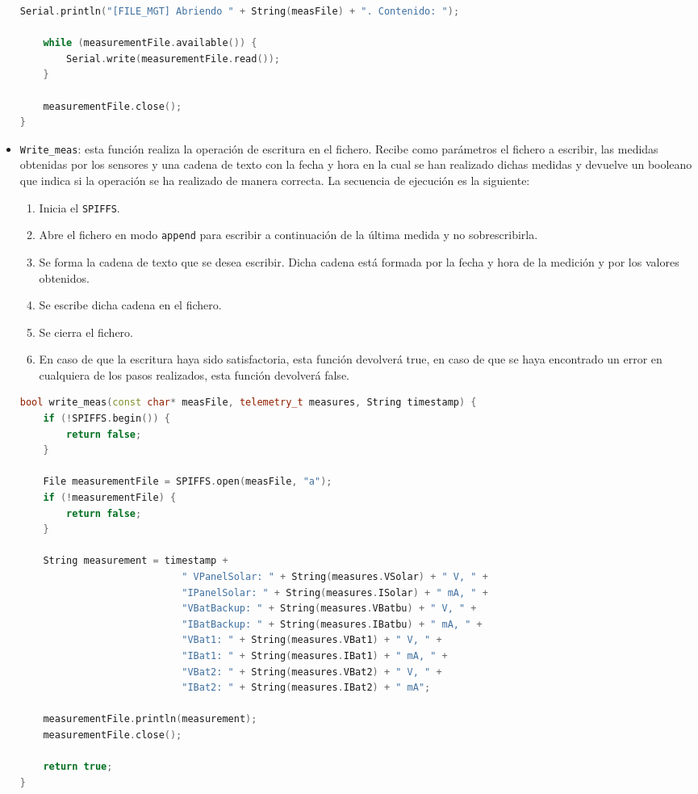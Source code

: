 \begin{itemize}
\begin{lstlisting}[captionpos=b, caption={Funcion \texttt{Read\_file}}, language=c++]
    Serial.println("[FILE_MGT] Abriendo " + String(measFile) + ". Contenido: ");

    while (measurementFile.available()) {
        Serial.write(measurementFile.read());
    }

    measurementFile.close();
}
    \end{lstlisting}
    \item \texttt{Write\_meas}: esta función realiza la operación de escritura en el fichero. Recibe como parámetros el fichero a escribir, las medidas obtenidas por los sensores y una cadena de texto con la fecha y hora en la cual se han realizado dichas medidas y devuelve un  booleano que indica si la operación se ha realizado de manera correcta. La secuencia de ejecución es la siguiente:
    \begin{enumerate}
        \item Inicia el \texttt{SPIFFS}.
        \item Abre el fichero en modo \texttt{append} para escribir a continuación de la última medida y no sobrescribirla.
        \item Se forma la cadena de texto que se desea escribir. Dicha cadena está formada por la fecha y hora de la medición y por los valores obtenidos.
        \item Se escribe dicha cadena en el fichero.
        \item Se cierra el fichero.
        \item En caso de que la escritura haya sido satisfactoria, esta función devolverá true, en caso de que se haya encontrado un error en cualquiera de los pasos realizados, esta función devolverá false.
    \end{enumerate}
    \begin{lstlisting}[captionpos=b, caption={Funcion \texttt{Write\_file}}, language=c++]
bool write_meas(const char* measFile, telemetry_t measures, String timestamp) {
    if (!SPIFFS.begin()) {
        return false;
    }

    File measurementFile = SPIFFS.open(measFile, "a");
    if (!measurementFile) {
        return false;
    }

    String measurement = timestamp +
                            " VPanelSolar: " + String(measures.VSolar) + " V, " +
                            "IPanelSolar: " + String(measures.ISolar) + " mA, " +
                            "VBatBackup: " + String(measures.VBatbu) + " V, " +
                            "IBatBackup: " + String(measures.IBatbu) + " mA, " +
                            "VBat1: " + String(measures.VBat1) + " V, " +
                            "IBat1: " + String(measures.IBat1) + " mA, " +
                            "VBat2: " + String(measures.VBat2) + " V, " +
                            "IBat2: " + String(measures.IBat2) + " mA";

    measurementFile.println(measurement);
    measurementFile.close();

    return true;
}
    \end{lstlisting}
\end{itemize}